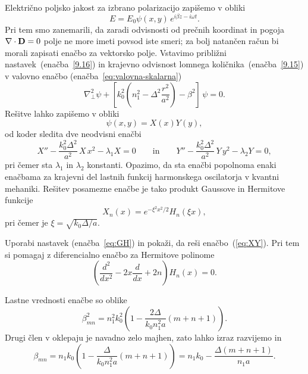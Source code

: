 Električno poljsko jakost za izbrano polarizacijo zapišemo v obliki 
\begin{equation}
E=E_{0}\psi(x,y)\, e^{i\beta z-i\omega t}.
\label{9.16}
\end{equation}
Pri tem smo zanemarili, da zaradi odvisnosti od prečnih koordinat in pogoja $\nabla\cdot{\bf D}=0$
polje ne more imeti povsod iste smeri; za bolj natančen račun bi morali zapisati enačbo za
vektorsko polje. Vstavimo približni
nastavek~(enačba~\ref{9.16}) in krajevno odvisnost lomnega količnika~(enačba~\ref{9.15})
v valovno enačbo (enačba~\ref{eq:valovna-skalarna}) 
\begin{equation}
\nabla_{\perp}^{2}\psi+\left[k_{0}^{2}\left(n_{1}^{2}-\Delta^{2}\frac{r^{2}}{a^2}\right)-
\beta^{2}\right]\,\psi=0.
\label{9.17}
\end{equation}
Rešitve lahko zapišemo v obliki
\begin{equation}
\psi(x,y) = X(x)Y(y),
\end{equation}
od koder sledita dve neodvisni enačbi
\begin{equation}
X'' - \frac{k_0^2 \Delta^2}{a^2}\,X\,x^2 - \lambda_1 X = 0 \qquad \mathrm{in} \qquad
Y'' - \frac{k_0^2 \Delta^2}{a^2}\,Y\,y^2 - \lambda_2 Y = 0,
\label{eq:XY}
\end{equation}
pri čemer sta $\lambda_1$ in $\lambda_2$ konstanti. 
Opazimo, da sta enačbi popolnoma enaki enačbama za krajevni del lastnih funkcij 
harmonskega oscilatorja v kvantni mehaniki. Rešitev posamezne enačbe je tako 
produkt Gaussove in Hermitove funkcije
\begin{equation}
X_n(x) = e^{-\xi^2 x^2/2} H_n(\xi x),
\label{eq:GH}
\end{equation}
pri čemer je $\xi = \sqrt{k_0 \Delta/a}$.
\begin{definition}
Uporabi nastavek (enačba~\ref{eq:GH}) in pokaži, da reši enačbo~(\ref{eq:XY}). Pri tem si pomagaj z 
diferencialno enačbo za Hermitove polinome
\begin{equation}
\left( \frac{d^2}{dx^2}-2x\frac{d}{dx}+2n \right) H_n(x) = 0.
\end{equation}
\end{definition}
Lastne vrednosti enačbe so oblike
\begin{equation}
\beta_{mn}^{2}=n_{1}^{2}k_{0}^{2}\left(1-\frac{2\Delta}{k_{0}n_{1}^2a}\left(m+n+1\right)\right).
\label{9.19}
\end{equation}
Drugi člen v oklepaju je navadno zelo majhen, zato lahko izraz razvijemo in 
\begin{equation}
\beta_{mn}=n_{1}k_{0}\left(1-\frac{\Delta}{k_{0}n_{1}^2 a}\left(m+n+1\right)\right)
= n_{1}k_{0} - \frac{\Delta \left(m+n+1\right)}{n_{1} a}.
\end{equation}
